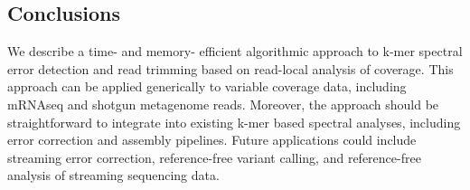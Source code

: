 \documentclass{article}
\begin{document}
\subsection{Conclusions}

We describe a time- and memory- efficient algorithmic approach to
k-mer spectral error detection and read trimming based on read-local
analysis of coverage.  This approach can be applied generically to
variable coverage data, including mRNAseq and shotgun metagenome
reads.  Moreover, the approach should be straightforward to integrate
into existing k-mer based spectral analyses, including error
correction and assembly pipelines.  Future applications could include
streaming error correction, reference-free variant calling, and
reference-free analysis of streaming sequencing data.



\end{document}
